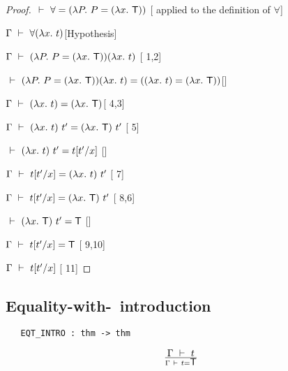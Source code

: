 \vspace{12pt plus2pt minus1pt}

\begin{proof}
\item $\ \vdash\  \forall = (\lambda P.\ P = (\lambda x.\ \mbox{\normalsize\sf T}))$ \hfill
[ applied to the definition of $\forall$]
\item $\Gamma\ \vdash\  \forall(\lambda x.\ t)$\hfill [Hypothesis]
\item $\Gamma\ \vdash\  (\lambda P.\ P=(\lambda x.\ \mbox{\normalsize\sf T}))(\lambda x.\ t)$\hfill
[ 1,2]
\item $\ \vdash\   (\lambda P.\ P=(\lambda x.\ \mbox{\normalsize\sf T}))(\lambda x.\ t) =
((\lambda x.\ t)=(\lambda x.\ \mbox{\normalsize\sf T}))$\hfill []
\item $\Gamma\ \vdash\  (\lambda x.\ t)=(\lambda x.\ \mbox{\normalsize\sf T})$\hfill [ 4,3]
\item $\Gamma\ \vdash\  (\lambda x.\ t)\ t' = (\lambda x.\ \mbox{\normalsize\sf T})\ t'$ \hfill
[ 5]
\item $\ \vdash\  (\lambda x.\ t)\ t' = t[t'/x]$ \hfill []
\item $\Gamma\turn t[t'/x] = (\lquant{x}t)\ t'$ \hfill [ 7]
\item $\Gamma\turn t[t'/x] = (\lquant{x}\T)\ t'$ \hfill [ 8,6]
\item $\ \vdash\  (\lambda x.\ \mbox{\normalsize\sf T})\ t' = \mbox{\normalsize\sf T}$ \hfill []
\item $\Gamma\ \vdash\  t[t'/x] = \mbox{\normalsize\sf T}$ \hfill [ 9,10]
\item $\Gamma\ \vdash\  t[t'/x]$ \hfill [ 11]
\end{proof}




\subsection{Equality-with-\T\ introduction}

\begin{boxed}
\begin{verbatim}
   EQT_INTRO : thm -> thm
\end{verbatim}\end{boxed}


\vspace{12pt plus2pt minus1pt}

$$\Gamma\ \vdash\  t\over\Gamma\ \vdash\  t=\mbox{\normalsize\sf T}$$

\vspace{12pt plus2pt minus1pt}

